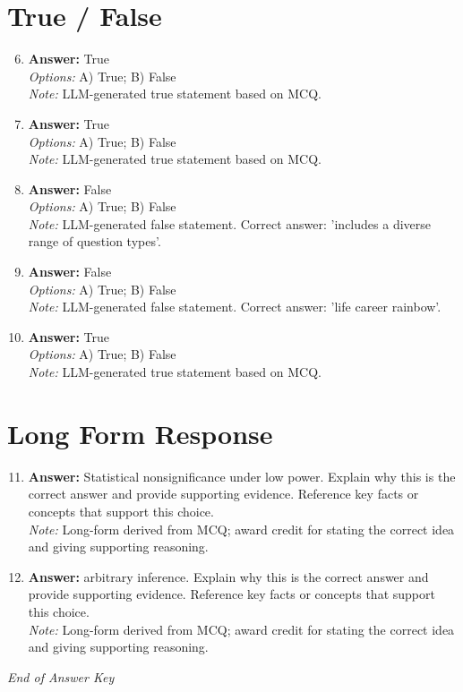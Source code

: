 \documentclass[12pt]{article}
\begin{document}
\section*{True / False}
\begin{enumerate}[label=\arabic*.]
\setcounter{enumi}{5}
\item \textbf{Answer:} True
\\ \textit{Options:} A) True; B) False
\\ \textit{Note:} LLM-generated true statement based on MCQ.
\item \textbf{Answer:} True
\\ \textit{Options:} A) True; B) False
\\ \textit{Note:} LLM-generated true statement based on MCQ.
\item \textbf{Answer:} False
\\ \textit{Options:} A) True; B) False
\\ \textit{Note:} LLM-generated false statement. Correct answer: 'includes a diverse range of question types'.
\item \textbf{Answer:} False
\\ \textit{Options:} A) True; B) False
\\ \textit{Note:} LLM-generated false statement. Correct answer: 'life career rainbow'.
\item \textbf{Answer:} True
\\ \textit{Options:} A) True; B) False
\\ \textit{Note:} LLM-generated true statement based on MCQ.
\end{enumerate}

\section*{Long Form Response}
\begin{enumerate}[label=\arabic*.]
\setcounter{enumi}{10}
\item \textbf{Answer:} Statistical nonsignificance under low power. Explain why this is the correct answer and provide supporting evidence. Reference key facts or concepts that support this choice.
\\ \textit{Note:} Long-form derived from MCQ; award credit for stating the correct idea and giving supporting reasoning.
\item \textbf{Answer:} arbitrary inference. Explain why this is the correct answer and provide supporting evidence. Reference key facts or concepts that support this choice.
\\ \textit{Note:} Long-form derived from MCQ; award credit for stating the correct idea and giving supporting reasoning.
\end{enumerate}

\vfill
\noindent\textit{End of Answer Key}
\end{document}
